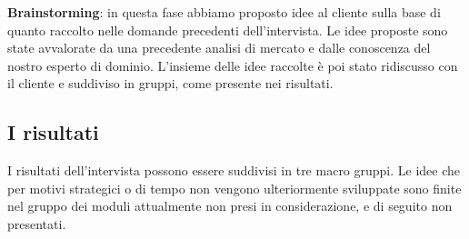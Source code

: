\documentclass[12pt]{article}
\begin{document}
\textbf{Brainstorming}: in questa fase abbiamo proposto idee al cliente sulla base di quanto raccolto nelle domande precedenti dell'intervista. Le idee proposte sono state avvalorate da una precedente analisi di mercato e dalle conoscenza del nostro esperto di dominio. L'insieme delle idee raccolte è poi stato ridiscusso con il cliente e suddiviso in gruppi, come presente nei risultati.
\\

\subsection{I risultati}

I risultati dell'intervista possono essere suddivisi in tre macro gruppi.
Le idee che per motivi strategici o di tempo non vengono ulteriormente sviluppate sono finite nel gruppo dei moduli attualmente non presi in considerazione, e di seguito non presentati.
\end{document}
